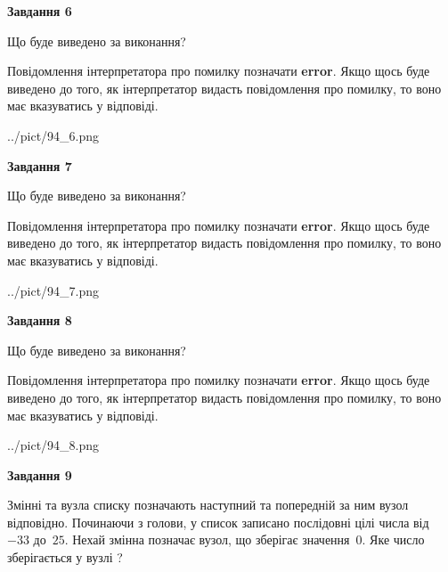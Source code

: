 \documentclass[12pt, ukrainian]{article}
\begin{document}
{\begin {large}
{\begin {center}\textbf{Завдання 6}\end {center}}\par
Що буде виведено за виконання?

Повідомлення інтерпретатора про помилку позначати \textbf{error}.
Якщо щось буде виведено до того, як інтерпретатор видасть повідомлення про помилку, 
то воно має вказуватись у відповіді. \par


\begin{center}
	{../pict/94_6.png}
\end{center}
\newpage

{\begin {center}\textbf{Завдання 7}\end {center}}\par
Що буде виведено за виконання?

Повідомлення інтерпретатора про помилку позначати \textbf{error}.
Якщо щось буде виведено до того, як інтерпретатор видасть повідомлення про помилку, 
то воно має вказуватись у відповіді. \par


\begin{center}
	{../pict/94_7.png}
\end{center}
\newpage

{\begin {center}\textbf{Завдання 8}\end {center}}\par
Що буде виведено за виконання?

Повідомлення інтерпретатора про помилку позначати \textbf{error}.
Якщо щось буде виведено до того, як інтерпретатор видасть повідомлення про помилку, 
то воно має вказуватись у відповіді. \par


\begin{center}
	{../pict/94_8.png}
\end{center}
\newpage

{\begin {center}\textbf{Завдання 9}\end {center}}\par
Змінні  та  вузла списку позначають наступний та попередній за ним вузол відповідно. Починаючи з голови, у список записано послідовні цілі числа від~$-33$ до~$25$. Нехай змінна  позначає вузол, що зберігає значення~$0$.
Яке число зберігається у вузлі  ?\par
\newpage


\end{large}}
\end{document}

